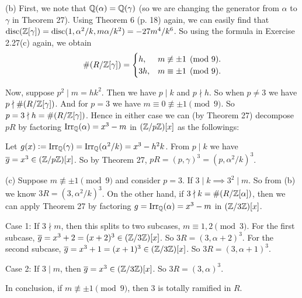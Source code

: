 \documentclass[../Marcus.tex]{subfiles}
\begin{document}
(b) First, we note that $\mathbb{Q}(\alpha) = \mathbb{Q}(\gamma)$ (so we are changing the generator from $\alpha$ to $\gamma$ in Theorem 27). Using Theorem 6 (p. 18) again, we can easily find that $\operatorname{disc}(\mathbb{Z}[\gamma])=\operatorname{disc}(1,\alpha^2/k,m\alpha/k^2)=-27m^4/k^6$. So using the formula in Exercise 2.27(c) again, we obtain 
$$
\#(R/\mathbb{Z}[\gamma]) =
\begin{cases}
h, & m\not\equiv \pm1 \pmod{9}. \\
3h, & m\equiv \pm1 \pmod{9}.
\end{cases}
$$

Now, suppose $p^2\mid m=hk^2$. Then we have $p\mid k$ and $p\nmid h$. So when $p\neq 3$ we have $p\nmid \#(R/\mathbb{Z}[\gamma])$. And for $p=3$ we have $m\equiv 0\not\equiv \pm 1\pmod{9}$. So $p=3\nmid h = \#(R/\mathbb{Z}[\gamma])$. Hence in either case we can (by Theorem 27) decompose $pR$ by factoring $\operatorname{Irr}_{\mathbb{Q}}(\alpha)=x^3-m$ in $(\mathbb{Z}/p\mathbb{Z})[x]$ as the followings:

Let $g(x):=\operatorname{Irr}_{\mathbb{Q}}(\gamma)=\operatorname{Irr}_{\mathbb{Q}}(\alpha^2/k)=x^3-h^2k$. From $p\mid k$ we have $\overline{g}=x^3\in(\mathbb{Z}/p\mathbb{Z})[x]$. So by Theorem 27, $pR=(p,\gamma)^3=(p,\alpha^2/k)^3$.

(c) Suppose $m\not\equiv \pm1\pmod{9}$ and consider $p=3$. If $3 \mid k \implies 3^2 \mid m$. So from (b) we know $3R=(3,\alpha^2/k)^3$. On the other hand, if $3\nmid k = \#(R/\mathbb{Z}[\alpha])$, then we can apply Theorem 27 by factoring $g=\operatorname{Irr}_{\mathbb{Q}}(\alpha)=x^3-m$ in $(\mathbb{Z}/3\mathbb{Z})[x]$.

Case 1: If $3\nmid m$, then this splits to two subcases, $m\equiv 1,2\pmod{3}$. For the first subcase, $\overline{g}=x^3+2=(x+2)^3\in(\mathbb{Z}/3\mathbb{Z})[x]$. So $3R=(3,\alpha+2)^3$. For the second subcase, $\overline{g}=x^3+1=(x+1)^3\in(\mathbb{Z}/3\mathbb{Z})[x]$. So $3R=(3,\alpha+1)^3$.

Case 2: If $3\mid m$, then $\overline{g}=x^3\in(\mathbb{Z}/3\mathbb{Z})[x]$. So $3R=(3,\alpha)^3$.

In conclusion, if $m\not\equiv \pm1\pmod{9}$, then $3$ is totally ramified in $R$.
\end{document}
